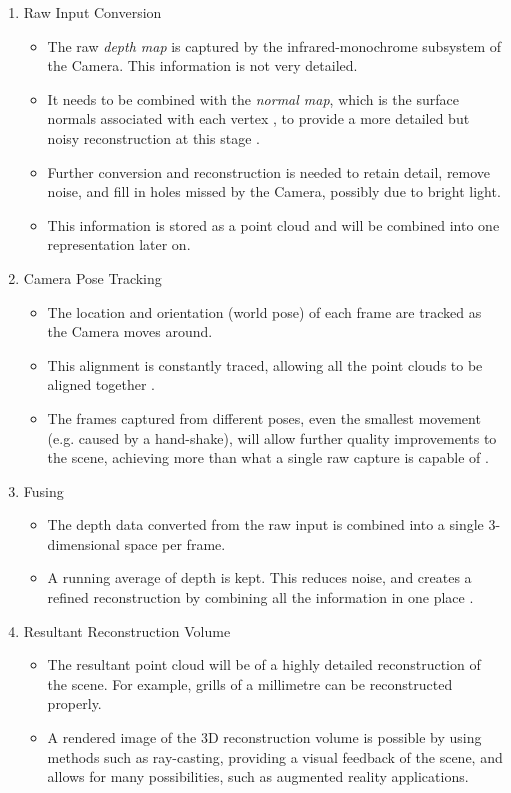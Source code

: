 \documentclass[11pt,openright,a4paper]{report}
\begin{document}
\begin{enumerate}
  \item Raw Input Conversion
    \begin{itemize}
      \item The raw \textit{depth map} is captured by the infrared-monochrome subsystem of the Camera. This information is not very detailed.  
      \item It needs to be combined with the \textit{normal map}, which is the surface normals associated with each vertex \cite{szeliski-book}, to provide a more detailed but noisy reconstruction at this stage \cite{kinect-research}. 
      \item Further conversion and reconstruction is needed to retain detail, remove noise, and fill in holes missed by the Camera, possibly due to bright light.
      \item This information is stored as a point cloud and will be combined into one representation later on.
    \end{itemize}

  \item Camera Pose Tracking
    \begin{itemize}
      \item The location and orientation (world pose) of each frame are tracked as the Camera moves around.
      \item This alignment is constantly traced, allowing all the point clouds to be aligned together \cite{kinect-doc}. 
      \item The frames captured from different poses, even the smallest movement (e.g. caused by a hand-shake), will allow further quality improvements to the scene, achieving more than what a single raw capture is capable of \cite{ms-3d-paper}.
    \end{itemize}

  \item Fusing 
    \begin{itemize}
      \item The depth data converted from the raw input is combined into a single 3-dimensional space per frame.
      \item A running average of depth is kept. This reduces noise, and creates a refined reconstruction by combining all the information in one place \cite{kinect-doc} \cite{ms-3d-paper}. 
    \end{itemize}

  \item Resultant Reconstruction Volume
    \begin{itemize}
      \item The resultant point cloud will be of a highly detailed reconstruction of the scene. For example, grills of a millimetre \cite{3d-paper} can be reconstructed properly.
      \item A rendered image of the 3D reconstruction volume is possible by using methods such as ray-casting, providing a visual feedback of the scene, and allows for many possibilities, such as augmented reality applications.
    \end{itemize}
\end{enumerate}
\end{document}
